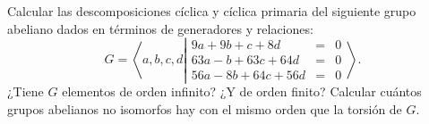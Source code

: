 \begin{ejercicio}\label{ej:7.14}
    Calcular las descomposiciones cíclica y cíclica primaria del siguiente grupo abeliano dados en términos de generadores y relaciones:
    \begin{equation*}
        G = \left\langle a, b, c, d \left|
            \begin{array}{rcl}
                9a + 9b + c + 8d &=& 0 \\
                63a - b + 63c + 64d &=& 0 \\
                56a - 8b + 64c + 56d &=& 0
            \end{array}
        \right.\right\rangle.
    \end{equation*}
    ¿Tiene $G$ elementos de orden infinito? ¿Y de orden finito? Calcular cuántos grupos abelianos no isomorfos hay con el mismo orden que la torsión de $G$.


\end{ejercicio}
